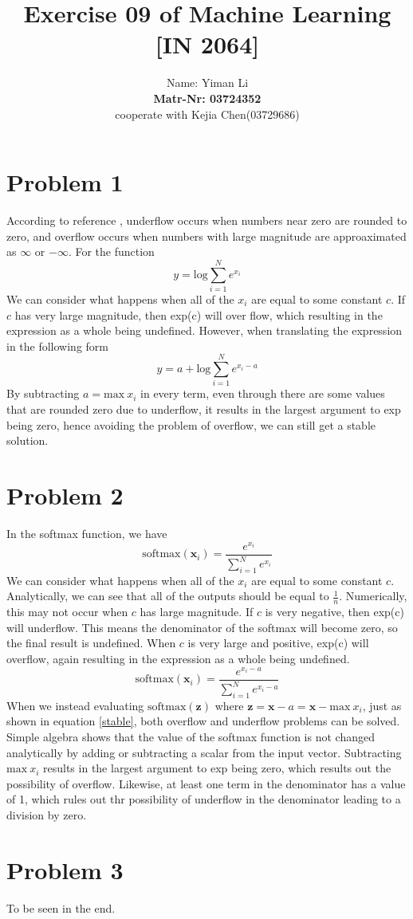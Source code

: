 \documentclass{article}
\title{Exercise 09 of Machine Learning [IN 2064]}
\author{
  Name: Yiman Li \\
  \textbf{Matr-Nr: 03724352} \\
  cooperate with Kejia Chen(03729686)\\
}
\begin{document}
\maketitle

\section*{Problem 1}
According to reference \cite{GoodBengCour16}, underflow occurs when numbers near zero are rounded to zero, and overflow occurs when numbers with large magnitude are approaximated as $\infty$ or $-\infty$. For the function
\begin{equation}
	y = \mathrm{log} \sum_{i=1}^{N}e^{x_i}
\end{equation}
We can consider what happens when all of the $x_i$ are equal to some constant $c$. If $c$ has very large magnitude, then exp(c) will over flow, which resulting in the expression as a whole being undefined. However, when translating the expression in the following form
\begin{equation}
	y =  a + \mathrm{log}\sum_{i=1}^{N}e^{x_i-a}
\end{equation}
By subtracting $a = \mathrm{max}\ x_i$ in every term, even through there are some values that are rounded zero due to underflow, it results in the largest  argument to exp being zero, hence avoiding the problem of overflow, we can still get a stable solution.

\section*{Problem 2}
In the softmax function, we have
\begin{equation}
\mathrm{softmax}(\bm{x}_i) = \frac{e^{x_i}}{\sum_{i=1}^{N}e^{x_i}}
\end{equation}
We can consider what happens when all of the $x_i$ are equal to some constant $c$. Analytically, we can see that all of the outputs should be equal to $\frac{1}{n}$. Numerically, this may not occur when $c$ has large magnitude. If $c$ is very negative, then exp(c) will underflow. This means the denominator of the softmax will become zero, so the final result is undefined. When $c$ is  very large and positive, exp(c) will overflow, again resulting in the expression as a whole being undefined.\\
\begin{equation}
\mathrm{softmax}(\bm{x}_i) = \frac{e^{x_i-a}}{\sum_{i=1}^{N}e^{x_i-a}}
\label{stable}
\end{equation}
When we instead evaluating $\mathrm{softmax}(\bm{z})$ where $\bm{z} =\bm{x} - a = \bm{x} - \mathrm{max}\ x_i$, just as shown in equation \ref{stable}, both overflow and underflow problems can be solved. Simple algebra shows that the value of the softmax function is not changed analytically by adding or subtracting a scalar from the input vector. Subtracting $\mathrm{max}\ x_i$ results in the largest  argument to exp being zero, which results out the possibility of overflow. Likewise, at least one term in the denominator has a value of 1, which rules out thr possibility of underflow in the denominator leading to a division by zero.

\section*{Problem 3}
To be seen in the end.

\small


\end{document}
